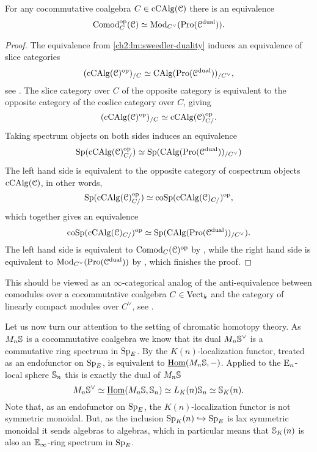 \begin{proposition}
    \label{ch2:prop:comodules-and-promodules}
    For any cocommutative coalgebra $C\in \cCAlg(\C)$ there is an equivalence 
    \[\Comod\op_C(\C)\simeq \Mod_{C^\vee}(\Pro(\C\dual)).\]  
\end{proposition}
\begin{proof}
    The equivalence from \cref{ch2:lm:sweedler-duality} induces an equivalence of slice categories 
    \[(\cCAlg(\C)\op)_{/C}\simeq \CAlg(\Pro(\C\dual))_{/C^\vee},\]
    see \cite[5.2.5.1]{lurie_09}. The slice category over $C$ of the opposite category is equivalent to the opposite category of the coslice category over $C$, giving 
    \[(\cCAlg(\C)\op)_{/C} \simeq \cCAlg(\C)\op_{C/}.\]
    Taking spectrum objects on both sides induces an equivalence
    \[\Sp(\cCAlg(\C)_{C/}\op)\simeq \Sp(\CAlg(\Pro(\C\dual))_{/C^\vee})\]
    The left hand side is equivalent to the opposite category of cospectrum objects $\cCAlg(\C)$, in other words, 
    \[\Sp(\cCAlg(\C)_{C/}\op)\simeq \coSp(\cCAlg(\C)_{C/})\op,\]
    which together gives an equivalence
    \[\coSp(\cCAlg(\C)_{C/})\op \simeq \Sp(\CAlg(\Pro(\C\dual))_{/C^\vee}).\]
    The left hand side is equivalent to $\Comod_C(\C)\op$ by \cite[1.0.3]{chen_2024}, while the right hand side is equivalent to $\Mod_{C^\vee}(\Pro(\C\dual))$ by \cite[7.3.4.13]{Lurie_HA}, which finishes the proof.  
\end{proof}

\begin{remark}
    This should be viewed as an $\infty$-categorical analog of the anti-equivalence between comodules over a cocommutative coalgebra $C\in \Vect_k$ and the category of linearly compact modules over $C^\vee$, see \cite[II.29]{lefschetz_1942}. 
\end{remark}

Let us now turn our attention to the setting of chromatic homotopy theory. As $M_n\S$ is a cocommutative coalgebra we know that its dual $M_n\S^\vee$ is a commutative ring spectrum in $\SpE$. By \cite[2.21(4)]{barthel-heard-valenzuela_2018} the $K(n)$-localization functor, treated as an endofunctor on $\SpE$, is equivalent to $\iHom(M_n\S,-)$. Applied to the $\En$-local sphere $\S_n$ this is exactly the dual of $M_n\S$
\[M_n \S^\vee \simeq \iHom(M_n\S, \S_n)\simeq L_\Kn \S_n \simeq \S_\Kn.\]
Note that, as an endofunctor on $\SpE$, the $K(n)$-localization functor is not symmetric monoidal. But, as the inclusion $\Sp_\Kn\hookrightarrow \SpE$ is lax symmetric monoidal it sends algebras to algebras, which in particular means that $\S_\Kn$ is also an $\E_\infty$-ring spectrum in $\SpE$. 

